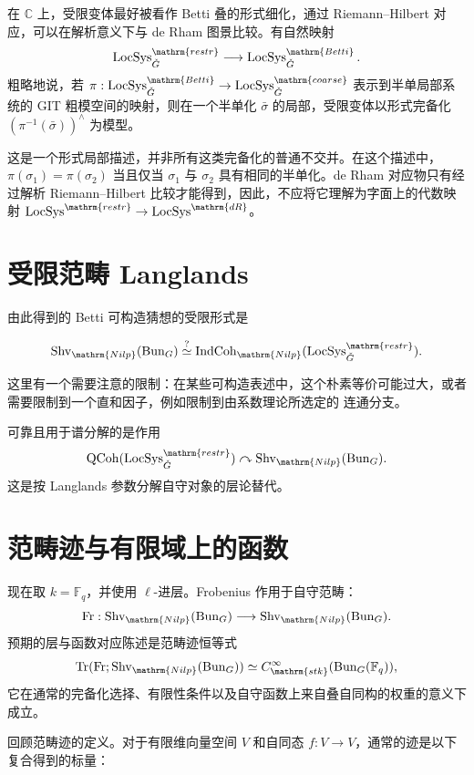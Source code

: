 在 $\mathbb C$ 上，受限变体最好被看作 Betti 叠的形式细化，通过 Riemann–Hilbert 对应，可以在解析意义下与 de Rham 图景比较。有自然映射
\[\LocSys^{\mathrm{restr}}_{\checkG}\longrightarrow\LocSys^{\mathrm{Betti}}_{\checkG}.\]
粗略地说，若 $\pi:\LocSys^{\mathrm{Betti}}_{\checkG}\to\LocSys^{\mathrm{coarse}}_{\checkG}$ 表示到半单局部系统的 GIT 粗模空间的映射，则在一个半单化 $\bar\sigma$ 的局部，受限变体以形式完备化 $(\pi^{-1}(\bar\sigma))^\wedge$ 为模型。
\begin{note}
这是一个形式局部描述，并非所有这类完备化的普通不交并。在这个描述中，$\pi(\sigma_1)=\pi(\sigma_2)$ 当且仅当 $\sigma_1$ 与 $\sigma_2$ 具有相同的半单化。de Rham 对应物只有经过解析 Riemann–Hilbert 比较才能得到，因此，不应将它理解为字面上的代数映射 $\LocSys^{\mathrm{restr}}\to\LocSys^{\mathrm{dR}}$。
\end{note}

\section{受限范畴 Langlands}\label{sec:12.6}
由此得到的 Betti 可构造猜想的受限形式是
\begin{conjecture*}{}
\[\Shv_{\mathrm{Nilp}}(\Bun_G)\overset{?}{\simeq}\IndCoh_{\mathrm{Nilp}}(\LocSys^{\mathrm{restr}}_{\checkG}).\]
\end{conjecture*}
\begin{note}
这里有一个需要注意的限制：在某些可构造表述中，这个朴素等价可能过大，或者需要限制到一个直和因子，例如限制到由系数理论所选定的
连通分支。
\end{note}
可靠且用于谱分解的是作用
\[\QCoh(\LocSys^{\mathrm{restr}}_{\checkG})\curvearrowright\Shv_{\mathrm{Nilp}}(\Bun_G).\]
这是按 Langlands 参数分解自守对象的层论替代。

\newpage
\section{范畴迹与有限域上的函数}\label{sec:12.7}
现在取 $k=\mathbb F_q$，并使用 $\ell$-进层。Frobenius 作用于自守范畴：
\[\Fr:\Shv_{\mathrm{Nilp}}(\Bun_G)\longrightarrow\Shv_{\mathrm{Nilp}}(\Bun_G).\]
预期的层与函数对应陈述是范畴迹恒等式
\[\Tr(\Fr;\Shv_{\mathrm{Nilp}}(\Bun_G))\simeq C^\infty_{\mathrm{stk}}(\Bun_G(\mathbb F_q)),\]
它在通常的完备化选择、有限性条件以及自守函数上来自叠自同构的权重的意义下成立。

回顾范畴迹的定义。对于有限维向量空间 $V$ 和自同态 $f:V\to V$，通常的迹是以下复合得到的标量：

